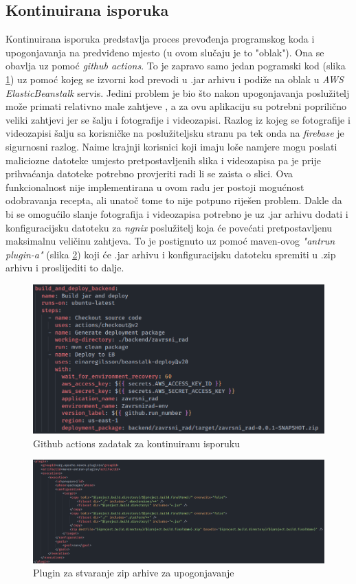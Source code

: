 \documentclass[times, utf8, zavrsni]{fer}
\begin{document}
\subsection{Kontinuirana isporuka}
Kontinuirana isporuka predstavlja proces prevođenja programskog koda i upogonjavanja na predviđeno mjesto (u ovom slučaju je to "oblak").
Ona se obavlja uz pomoć \textit{github actions}. To je zapravo samo jedan pogramski kod
(slika \ref{fig:Backend cicd}) uz pomoć kojeg se izvorni kod prevodi u .jar arhivu i podiže na
oblak u \textit{AWS ElasticBeanstalk} servis.
Jedini problem je bio što nakon upogonjavanja poslužitelj može primati relativno male zahtjeve
, a za ovu aplikaciju su potrebni poprilično veliki zahtjevi jer se šalju i fotografije i videozapisi.
Razlog iz kojeg se fotografije i videozapisi šalju sa korisničke na poslužiteljsku stranu pa tek onda
na \textit{firebase} je sigurnosni razlog. Naime krajnji korisnici koji imaju loše namjere
mogu poslati maliciozne datoteke umjesto pretpostavljenih slika
i videozapisa pa je prije prihvaćanja datoteke potrebno provjeriti radi li se zaista o slici. Ova funkcionalnost
nije implementirana u ovom radu jer postoji mogućnost odobravanja recepta, ali unatoč tome to nije potpuno riješen problem.
Dakle da bi se omogućilo slanje fotografija i videozapisa potrebno je
uz .jar arhivu  dodati i konfiguracijsku datoteku za \textit{ngnix} poslužitelj koja će povećati
pretpostavljenu maksimalnu veličinu zahtjeva. To je postignuto uz pomoć maven-ovog \textit{"antrun plugin-a"}
(slika \ref{fig:antrun}) koji će .jar arhivu i konfiguracijsku datoteku spremiti u .zip arhivu i proslijediti to dalje.
\begin{figure}[h]
      \centering
      \includegraphics[width=\textwidth]{backend_cicd.png}
      \caption{Github actions zadatak za kontinuiranu isporuku}
      \label{fig:Backend cicd}
\end{figure}
\begin{figure}[h]
      \centering
      \includegraphics[width=\textwidth]{antrun.png}
      \caption{Plugin za stvaranje zip arhive za upogonjavanje}
      \label{fig:antrun}
\end{figure}
\end{document}
